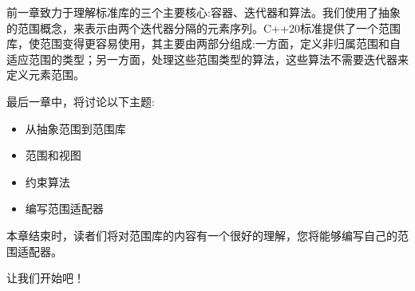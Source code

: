 前一章致力于理解标准库的三个主要核心:容器、迭代器和算法。我们使用了抽象的范围概念，来表示由两个迭代器分隔的元素序列。C++20标准提供了一个范围库，使范围变得更容易使用，其主要由两部分组成:一方面，定义非归属范围和自适应范围的类型；另一方面，处理这些范围类型的算法，这些算法不需要迭代器来定义元素范围。

最后一章中，将讨论以下主题:

\begin{itemize}
\item
从抽象范围到范围库

\item
范围和视图

\item
约束算法

\item
编写范围适配器
\end{itemize}

本章结束时，读者们将对范围库的内容有一个很好的理解，您将能够编写自己的范围适配器。

让我们开始吧！


















